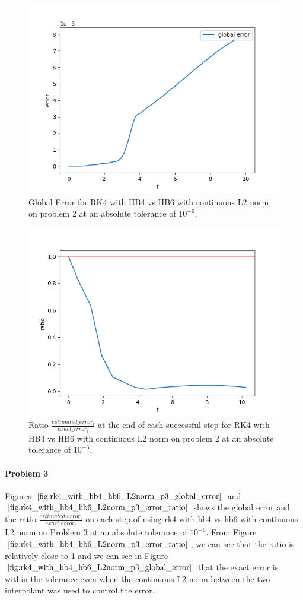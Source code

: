 \begin{figure}[H]
\centering
\includegraphics[width=0.7\linewidth]{./figures/rk4_with_hb4_hb6_L2norm_p2_global_error}
\caption{Global Error for RK4 with HB4 vs HB6 with continuous L2 norm on problem 2 at an absolute tolerance of $10^{-6}$.}
\label{fig:rk4_with_hb4_hb6_L2norm_p2_global_error}
\end{figure}

\begin{figure}[H]
\centering
\includegraphics[width=0.7\linewidth]{./figures/rk4_with_hb4_hb6_L2norm_p2_error_ratio}
\caption{Ratio $\frac{estimated\_error_i}{exact\_error_i}$ at the end of each successful step for RK4 with HB4 vs HB6 with continuous L2 norm on problem 2 at an absolute tolerance of $10^{-6}$.}
\label{fig:rk4_with_hb4_hb6_L2norm_p2_error_ratio}
\end{figure}

\paragraph{Problem 3} Figures $\ref{fig:rk4_with_hb4_hb6_L2norm_p3_global_error}$ and $\ref{fig:rk4_with_hb4_hb6_L2norm_p3_error_ratio}$ shows the global error and the ratio $\frac{estimated\_error_i}{exact\_error_i}$ on each step of using rk4 with hb4 vs hb6 with continuous L2 norm on Problem 3 at an absolute tolerance of $10^{-6}$. From Figure $\ref{fig:rk4_with_hb4_hb6_L2norm_p3_error_ratio}$, we can see that the ratio is relatively close to 1 and we can see in Figure  $\ref{fig:rk4_with_hb4_hb6_L2norm_p3_global_error}$ that the exact error is within the tolerance even when the continuous L2 norm between the two interpolant was used to control the error.

